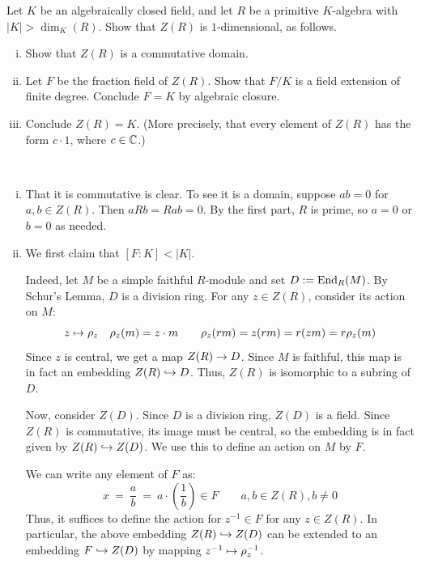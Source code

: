\begin{exr}
	Let $K$ be an algebraically closed field, and let $R$ be a primitive
	$K$-algebra with $|K| > \dim_K(R)$.
	Show that $Z(R)$ is $1$-dimensional, as follows.
	\begin{enumerate}[i)]
		\item Show that $Z(R)$ is a commutative domain.
		\item Let $F$ be the fraction field of $Z(R)$.
			Show that $F/K$ is a field extension of finite degree.
			Conclude $F=K$ by algebraic closure.
		\item Conclude $Z(R)=K$.
			(More precisely, that every element of $Z(R)$ has the form $c\cdot 1$,
			where $c\in \mathbb{C}$.)
	\end{enumerate}
\end{exr} \

\begin{pf} \vspace{-0.3in}
	\begin{enumerate}[i)]
		\item That it is commutative is clear.
			To see it is a domain, suppose $ab=0$ for $a,b\in Z(R)$.
			Then $aRb=Rab=0$. By the first part, $R$ is prime, so
			$a=0$ or $b=0$ as needed.

		\item We first claim that $[F:K] < |K|$.
			
			Indeed, let $M$ be a simple faithful $R$-module and set $D:=\operatorname{End}_{R}(M)$.
			By Schur's Lemma, $D$ is a division ring.
			For any $z\in Z(R)$, consider its action on $M$:
			\begin{equation*}
				z\mapsto\rho_{z} \quad \rho_{z}(m)=z\cdot m \qquad
				\rho_{z}(rm) = z(rm) = r(zm) = r\rho_{z}(m)
			\end{equation*}
			Since $z$ is central, we get a map $Z(R)\rightarrow D$.
			Since $M$ is faithful, this map is in fact an embedding $Z(R)\hookrightarrow D$.
			Thus, $Z(R)$ is isomorphic to a subring of $D$.

			Now, consider $Z(D)$.
			Since $D$ is a division ring, $Z(D)$ is a field.
			Since $Z(R)$ is commutative, its image must be central, so the
			embedding is in fact given by $Z(R)\hookrightarrow Z(D)$.
			We use this to define an action on $M$ by $F$.

			We can write any element of $F$ as:
			\begin{equation*}
				x \ = \ \frac{a}{b} \ = \ a\cdot\left(\frac{1}{b}\right)\in F \qquad
				a,b\in Z(R),b\neq0
			\end{equation*}
			Thus, it suffices to define the action for $z^{-1}\in F$ for any
			$z\in Z(R)$.
			In particular, the above embedding $Z(R)\hookrightarrow Z(D)$ can be extended
			to an embedding $F\hookrightarrow Z(D)$ by mapping $z^{-1}\mapsto\rho_{z}^{-1}$.


\end{enumerate}
\end{pf}
